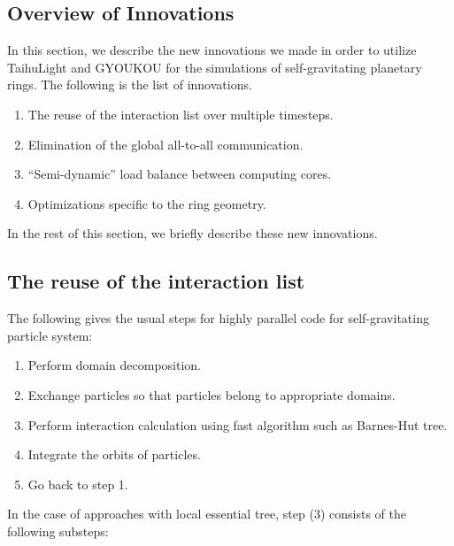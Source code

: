 \documentclass[conference]{IEEEtran}
\begin{document}
  \subsection{Overview of Innovations}

  
In this section, we describe the new innovations we made in order to
utilize TaihuLight and GYOUKOU for the simulations of self-gravitating
planetary rings. The following is the list of innovations.


\begin{enumerate}
\item The reuse of the interaction list over multiple timesteps.
\item Elimination of  the global all-to-all communication.
\item ``Semi-dynamic'' load balance between computing cores.
\item Optimizations specific to the ring geometry.
\end{enumerate}  

In the rest of this section, we briefly describe these new innovations.

\subsection{The reuse of the interaction list}
\label{subsec:list}


The following gives the usual steps for highly parallel code for
self-gravitating particle system:

\begin{enumerate}

  \item Perform domain decomposition.
  \item Exchange particles so that particles belong to appropriate domains.
  \item Perform interaction calculation using fast algorithm such as
    Barnes-Hut tree.
  \item Integrate the orbits of particles.
  \item Go back to step 1.

\end{enumerate}

In the case of approaches with local essential tree, step (3) consists
of the following substeps:
\end{document}
